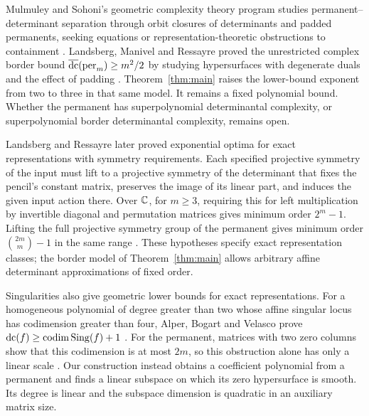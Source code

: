 Mulmuley and Sohoni's geometric complexity theory program studies
permanent--determinant separation through orbit closures of determinants
and padded permanents, seeking equations or representation-theoretic
obstructions to containment
\cite{MulmuleySohoni2001,MulmuleySohoni2008}.
Landsberg, Manivel and Ressayre proved the unrestricted complex border
bound $\operatorname{\overline{dc}}(\operatorname{per}_m)\ge m^2/2$ by studying hypersurfaces with degenerate
duals and the effect of padding
\cite[Theorem~1.1.1]{LandsbergManivelRessayre2010}.
Theorem~\ref{thm:main} raises the lower-bound exponent from two to three
in that same model. It remains a fixed polynomial bound. Whether the
permanent has superpolynomial determinantal complexity, or superpolynomial
border determinantal complexity, remains open.

Landsberg and Ressayre later proved exponential optima for exact
representations with symmetry requirements. Each specified projective
symmetry of the input must lift to a projective symmetry of the determinant
that fixes the pencil's constant matrix, preserves the image of its linear
part, and induces the given input action there. Over $\mathbb C$, for $m\ge3$,
requiring this for left multiplication by invertible diagonal and
permutation matrices gives minimum order $2^m-1$. Lifting the full
projective symmetry group of the permanent gives minimum order
$\binom{2m}{m}-1$ in the same range
\cite[Theorems~2.1 and~2.8; Propositions~2.9 and~2.10]{LandsbergRessayre2017}.
These hypotheses specify exact representation classes; the border model
of Theorem~\ref{thm:main} allows arbitrary affine determinant
approximations of fixed order.

Singularities also give geometric lower bounds for exact representations.
For a homogeneous polynomial of degree greater than two whose affine
singular locus has codimension greater than four, Alper, Bogart and Velasco
prove
$\operatorname{dc}(f)\ge\operatorname{codim}\operatorname{Sing}(f)+1$
\cite[Theorem~1.2]{AlperBogartVelasco2017}.
For the permanent, matrices with two zero columns show that this
codimension is at most $2m$, so this obstruction alone has only a linear
scale \cite[Remark~1.5]{AlperBogartVelasco2017}.
Our construction instead obtains a coefficient polynomial from a permanent
and finds a linear subspace on which its zero hypersurface is smooth. Its
degree is linear and the subspace dimension is quadratic in an auxiliary
matrix size.

